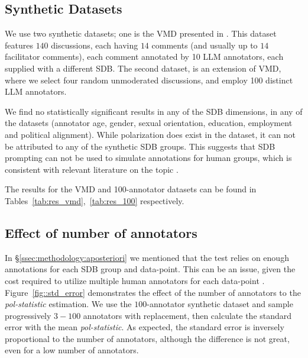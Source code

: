 \documentclass[twocolumn, 8pt]{article}
\begin{document}




\subsection{Synthetic Datasets}

We use two synthetic datasets; one is the \ac{VMD} presented in \textcite{tsirmpas2025scalableevaluationonlinefacilitation}. This dataset features $140$ discussions, each having $14$ comments (and usually up to $14$ facilitator comments), each comment annotated by 10 \ac{LLM} annotators, each supplied with a different \ac{SDB}. The second dataset, is an extension of \ac{VMD}, where we select four random unmoderated discussions, and employ 100 distinct \ac{LLM} annotators.

We find no statistically significant results in any of the \ac{SDB} dimensions, in any of the datasets (annotator age, gender, sexual orientation, education, employment and political alignment). While polarization does exist in the dataset, %
it can not be attributed to any of the synthetic \ac{SDB} groups. This suggests that \ac{SDB} prompting can not be used to simulate annotations for human groups, which is consistent with relevant literature on the topic \parencite{anthis_2025,hewitt2024predicting,rossi_2024,jansen_2023,bisbee_2023,neumann_2025}.

The results for the \ac{VMD} and 100-annotator datasets can be found in Tables~\ref{tab:res_vmd},~\ref{tab:res_100} respectively.





\subsection{Effect of number of annotators}
\label{ssec: results:num_annotators}

In \S\ref{ssec:methodology:aposteriori} we mentioned that the test relies on enough annotations for each \ac{SDB} group and data-point. This can be an issue, given the cost required to utilize multiple human annotators for each data-point \parencite{rossi_2024}. Figure~\ref{fig::std_error} demonstrates the effect of the number of annotators to the \textit{pol-statistic} estimation. We use the $100$-annotator synthetic dataset and sample progressively $3-100$ annotators with replacement, then calculate the standard error with the mean \textit{pol-statistic}. As expected, the standard error is inversely proportional to the number of annotators, although the difference is not great, even for a low number of annotators.
\end{document}

